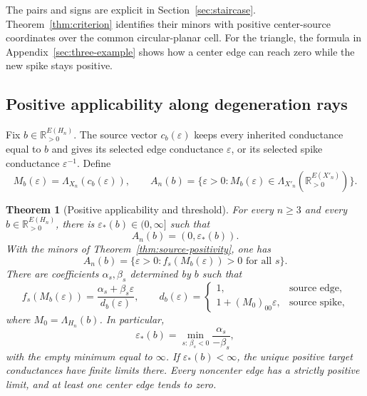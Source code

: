 \documentclass[11pt]{article}
\newtheorem{theorem}{Theorem}[section]
\theoremstyle{definition}
\newcommand{\RR}{\mathbb R}
\begin{document}
The pairs and signs are explicit in Section~\ref{sec:staircase}.
Theorem~\ref{thm:criterion} identifies their minors with positive
center-source coordinates over the common circular-planar cell.
For the triangle, the formula in Appendix~\ref{sec:three-example}
shows how a center edge can reach zero while the new spike stays positive.

\subsection{Positive applicability along degeneration rays}

Fix $b\in\RR_{>0}^{E(H_n)}$. The source vector $c_b(\varepsilon)$
keeps every inherited conductance equal to $b$ and gives its selected
edge conductance $\varepsilon$, or its selected spike conductance
$\varepsilon^{-1}$. Define
\begin{equation}
 M_b(\varepsilon)=\Lambda_{X_n}(c_b(\varepsilon)),\qquad
 A_n(b)=\{\varepsilon>0:M_b(\varepsilon)
       \in\Lambda_{X'_n}(\RR_{>0}^{E(X'_n)})\}.
 \label{eq:positive-set}
\end{equation}

\begin{theorem}[Positive applicability and threshold]
\label{thm:nonreentry}
For every $n\ge3$ and every $b\in\RR_{>0}^{E(H_n)}$, there is
$\varepsilon_*(b)\in(0,\infty]$ such that
\[
 A_n(b)=(0,\varepsilon_*(b)).
\]
With the minors of Theorem~\ref{thm:source-positivity}, one has
\begin{equation}
 A_n(b)=\{\varepsilon>0:f_s(M_b(\varepsilon))>0
                         \text{ for all }s\}.
 \label{eq:ray-criterion}
\end{equation}
There are coefficients $\alpha_s,\beta_s$ determined by $b$ such that
\[
 f_s(M_b(\varepsilon))=
 \frac{\alpha_s+\beta_s\varepsilon}{d_b(\varepsilon)},
 \qquad
 d_b(\varepsilon)=
 \begin{cases}
 1,&\text{source edge},\\
 1+(M_0)_{00}\varepsilon,&\text{source spike},
 \end{cases}
\]
where $M_0=\Lambda_{H_n}(b)$. In particular,
\begin{equation}
 \varepsilon_*(b)=
 \min_{s:\,\beta_s<0}\frac{\alpha_s}{-\beta_s},
 \label{eq:threshold}
\end{equation}
with the empty minimum equal to $\infty$.
If $\varepsilon_*(b)<\infty$, the unique positive target
conductances have finite limits there. Every noncenter edge has
a strictly positive limit, and at least one center edge tends to zero.
\end{theorem}
\end{document}
